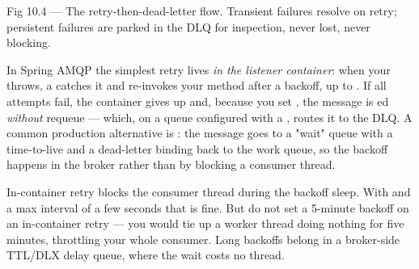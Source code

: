 \begin{wbfigure}{Fig 10.4 --- The retry-then-dead-letter flow. Transient failures resolve on retry; persistent failures are parked in the DLQ for inspection, never lost, never blocking.}
\end{wbfigure}

 In Spring AMQP the simplest retry lives \emph{in the listener container}: when your  throws, a  catches it and re-invokes your method after a backoff, up to . If all attempts fail, the container gives up and, because you set , the message is ed \emph{without} requeue --- which, on a queue configured with a , routes it to the DLQ. A common production alternative is : the message goes to a "wait" queue with a time-to-live and a dead-letter binding back to the work queue, so the backoff happens in the broker rather than by blocking a consumer thread.

\begin{perfnote}
In-container retry blocks the consumer thread during the backoff sleep. With  and a max interval of a few seconds that is fine. But do not set a 5-minute backoff on an in-container retry --- you would tie up a worker thread doing nothing for five minutes, throttling your whole consumer. Long backoffs belong in a broker-side TTL/DLX delay queue, where the wait costs no thread.
\end{perfnote}

